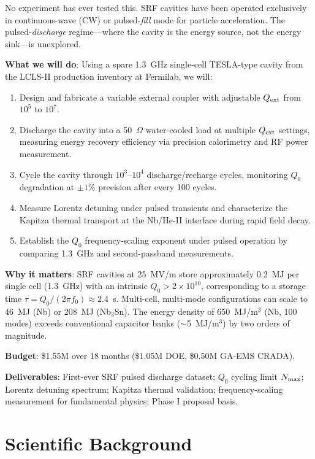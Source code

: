 \documentclass[11pt]{article}
\newcommand{\ee}[1]{\times 10^{#1}}
\newcommand{\Qext}{Q_{\rm ext}}
\newcommand{\Qzero}{Q_0}
\begin{document}
No experiment has ever tested this. SRF cavities have been operated
exclusively in continuous-wave (CW) or pulsed-\emph{fill} mode for
particle acceleration. The pulsed-\emph{discharge} regime---where the
cavity is the energy source, not the energy sink---is unexplored.

\textbf{What we will do}: Using a spare 1.3~GHz single-cell
TESLA-type cavity from the LCLS-II production inventory at Fermilab,
we will:
\begin{enumerate}[nosep]
  \item Design and fabricate a variable external coupler with
    adjustable $\Qext$ from $10^5$ to $10^7$.
  \item Discharge the cavity into a 50~$\Omega$ water-cooled load
    at multiple $\Qext$ settings, measuring energy recovery
    efficiency via precision calorimetry and RF power measurement.
  \item Cycle the cavity through $10^3$--$10^4$ discharge/recharge
    cycles, monitoring $\Qzero$ degradation at $\pm 1\%$ precision
    after every 100 cycles.
  \item Measure Lorentz detuning under pulsed transients and
    characterize the Kapitza thermal transport at the Nb/He-II
    interface during rapid field decay.
  \item Establish the $\Qzero$ frequency-scaling exponent under
    pulsed operation by comparing 1.3~GHz and second-passband
    measurements.
\end{enumerate}

\textbf{Why it matters}: SRF cavities at 25~MV/m store approximately
0.2~MJ per single cell (1.3~GHz) with an intrinsic $\Qzero > 2\ee{10}$,
corresponding to a storage time $\tau = \Qzero/(2\pi f_0) \approx 2.4$~s.
Multi-cell, multi-mode configurations can scale to 46~MJ (Nb) or
208~MJ (Nb$_3$Sn). The energy density of 650~MJ/m$^3$ (Nb, 100 modes)
exceeds conventional capacitor banks ($\sim$5~MJ/m$^3$) by two orders
of magnitude.

\textbf{Budget}: \$1.55M over 18 months (\$1.05M DOE, \$0.50M
GA-EMS CRADA).

\textbf{Deliverables}: First-ever SRF pulsed discharge dataset;
$\Qzero$ cycling limit $N_{\rm max}$; Lorentz detuning spectrum;
Kapitza thermal validation; frequency-scaling measurement for
fundamental physics; Phase I proposal basis.

\section{Scientific Background}
\label{sec:background}
\end{document}
